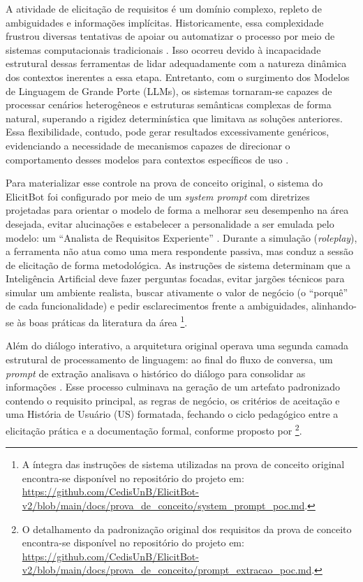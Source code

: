 A atividade de elicitação de requisitos é um domínio complexo, repleto de ambiguidades e informações implícitas. Historicamente, essa complexidade frustrou diversas tentativas de apoiar ou automatizar o processo por meio de sistemas computacionais tradicionais \cite{korn2025, khan2024}. Isso ocorreu devido à incapacidade estrutural dessas ferramentas de lidar adequadamente com a natureza dinâmica dos contextos inerentes a essa etapa. Entretanto, com o surgimento dos Modelos de Linguagem de Grande Porte (LLMs), os sistemas tornaram-se capazes de processar cenários heterogêneos e estruturas semânticas complexas de forma natural, superando a rigidez determinística que limitava as soluções anteriores. Essa flexibilidade, contudo, pode gerar resultados excessivamente genéricos, evidenciando a necessidade de mecanismos capazes de direcionar o comportamento desses modelos para contextos específicos de uso \cite{ataei2024, neumann2025}.

Para materializar esse controle na prova de conceito original, o sistema do ElicitBot foi configurado por meio de um \textit{system prompt} com diretrizes projetadas para orientar o modelo de forma a melhorar seu desempenho na área desejada, evitar alucinações e estabelecer a personalidade a ser emulada pelo modelo: um ``Analista de Requisitos Experiente'' \cite{junior2025}. Durante a simulação (\textit{roleplay}), a ferramenta não atua como uma mera respondente passiva, mas conduz a sessão de elicitação de forma metodológica. As instruções de sistema determinam que a Inteligência Artificial deve fazer perguntas focadas, evitar jargões técnicos para simular um ambiente realista, buscar ativamente o valor de negócio (o ``porquê'' de cada funcionalidade) e pedir esclarecimentos frente a ambiguidades, alinhando-se às boas práticas da literatura da área \cite{sommerville2016}\footnote{A íntegra das instruções de sistema utilizadas na prova de conceito original encontra-se disponível no repositório do projeto em: \url{https://github.com/CedisUnB/ElicitBot-v2/blob/main/docs/prova_de_conceito/system_prompt_poc.md}.}.

Além do diálogo interativo, a arquitetura original operava uma segunda camada estrutural de processamento de linguagem: ao final do fluxo de conversa, um \textit{prompt} de extração analisava o histórico do diálogo para consolidar as informações \cite{khan2024}. Esse processo culminava na geração de um artefato padronizado contendo o requisito principal, as regras de negócio, os critérios de aceitação e uma História de Usuário (US) formatada, fechando o ciclo pedagógico entre a elicitação prática e a documentação formal, conforme proposto por \footnote{O detalhamento da padronização original dos requisitos da prova de conceito encontra-se disponível no repositório do projeto em: \url{https://github.com/CedisUnB/ElicitBot-v2/blob/main/docs/prova_de_conceito/prompt_extracao_poc.md}.}.

